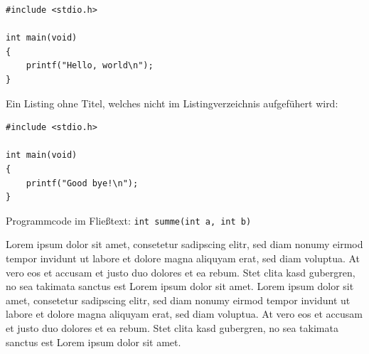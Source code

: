 \begin{lstlisting}[caption={Beschreibung des Listings.}, label=beispiellisting]
#include <stdio.h>

int main(void)
{
    printf("Hello, world\n");
}
\end{lstlisting}

Ein Listing ohne Titel, welches nicht im Listingverzeichnis aufgefühert wird:

\begin{lstlisting}[numbers=none]
#include <stdio.h>

int main(void)
{
    printf("Good bye!\n");
}
\end{lstlisting}

Programmcode im Fließtext: \lstinline{int summe(int a, int b)}

Lorem ipsum dolor sit amet, consetetur sadipscing elitr, sed diam nonumy eirmod tempor invidunt ut labore et dolore magna aliquyam erat, sed diam voluptua. At vero eos et accusam et justo duo dolores et ea rebum. Stet clita kasd gubergren, no sea takimata sanctus est Lorem ipsum dolor sit amet. Lorem ipsum dolor sit amet, consetetur sadipscing elitr, sed diam nonumy eirmod tempor invidunt ut labore et dolore magna aliquyam erat, sed diam voluptua. At vero eos et accusam et justo duo dolores et ea rebum. Stet clita kasd gubergren, no sea takimata sanctus est Lorem ipsum dolor sit amet.
